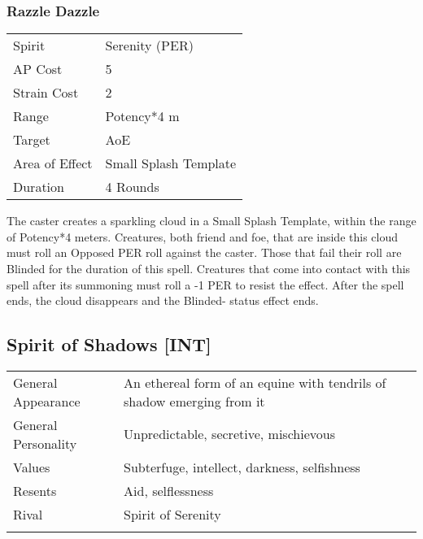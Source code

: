 \documentclass[11pt,a4paper,twocolumn]{book}
\begin{document}
\subsubsection*{Razzle Dazzle}
{
	\begin{tabu} to 70mm{| X[l,4] | X[l,7] |}
		\hline
		Spirit         & Serenity (PER)        \\
		AP Cost        & 5                     \\
		Strain Cost    & 2                     \\
		Range          & Potency*4 m           \\
		Target         & AoE                   \\
		Area of Effect & Small Splash Template \\
		Duration       & 4 Rounds              \\ \hline
	\end{tabu}
	
}
\medskip

The caster creates a sparkling cloud in a Small Splash Template, within the range of Potency*4 meters. Creatures, both friend and foe, that are inside this cloud must roll an Opposed PER roll against the caster. Those that fail their roll are Blinded for the duration of this spell. Creatures that come into contact with this spell after its summoning must roll a -1 PER to resist the effect. After the spell ends, the cloud disappears and the Blinded- status effect ends.

\subsection*{Spirit of Shadows [INT]}

{
	\begin{tabu} to 75mm{| X[l,4] | X[l,8] |}
		\hline
		General Appearance  & An ethereal form of an equine with tendrils of shadow emerging from it \\
		General Personality & Unpredictable, secretive, mischievous                         \\
		Values              & Subterfuge, intellect, darkness, selfishness                                                \\
		Resents             & Aid, selflessness                                        \\
		Rival               & Spirit of Serenity                                                       \\
		                    &                                                                          \\ \hline
	\end{tabu}
	
}
\end{document}
